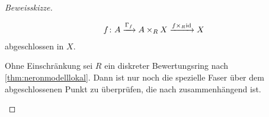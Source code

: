 \begin{Satz}
\begin{proof}[Beweisskizze]
\begin{description}[font=\normalfont\itshape]
      \begin{gather*}
        f\colon A\xrightarrow{\Gamma_f} A\times_R X
        \xrightarrow{f\times_R\mathrm{id}} X
      \end{gather*}
      abgeschlossen in $X$.
    \item[$A$ hat zusammenhängende Fasern:]
      Ohne Einschränkung sei $R$ ein diskreter Bewertungsring nach
      \ref{thm:neronmodelllokal}.
      Dann ist nur noch die spezielle Faser über dem abgeschlossenen
      Punkt zu überprüfen, die nach \cite[{}5.5.1]{EGAIII-1} zusammenhängend
      ist.
      \qedhere
    \end{description}
  \end{proof}
\end{Satz}

